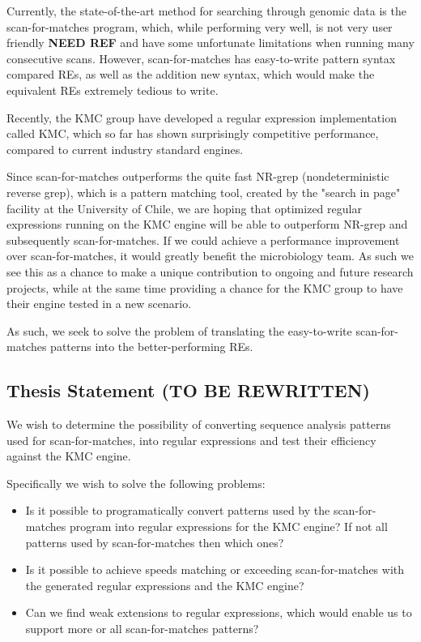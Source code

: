 \documentclass[12pt]{article}
\theoremstyle{definition}
\begin{document}
Currently, the state-of-the-art method for searching through genomic data is the scan-for-matches program, which, while performing very well, is not very user friendly \textbf{NEED REF} and have some unfortunate limitations when running many consecutive scans. However, scan-for-matches has easy-to-write pattern syntax compared REs, as well as the addition new syntax, which would make the equivalent REs extremely tedious to write.

Recently, the KMC group have developed a regular expression implementation called KMC, which so far has shown surprisingly competitive performance, compared to current industry standard engines\cite{two-pass-greedy}.

Since scan-for-matches outperforms the quite fast NR-grep (nondeterministic reverse grep), which is a pattern matching tool, created by the "search in page" facility at the University of Chile\cite{nrgrep}, we are hoping that optimized regular expressions running on the KMC engine will be able to outperform NR-grep and subsequently scan-for-matches.
If we could achieve a performance improvement over scan-for-matches, it would greatly benefit the microbiology team. As such we see this as a chance to make a unique contribution to ongoing and future research projects, while at the same time providing a chance for the KMC group to have their engine tested in a new scenario.

As such, we seek to solve the problem of translating the easy-to-write scan-for-matches patterns into the better-performing REs.


\subsection{Thesis Statement (TO BE REWRITTEN)}

We wish to determine the possibility of converting sequence analysis patterns used for scan-for-matches\cite{scan-for-matches}, into regular expressions\cite{crash-course-regex} and test their efficiency against the KMC\cite{kmc-website} engine.

Specifically we wish to solve the following problems:

\begin{itemize}
	\item Is it possible to programatically convert patterns used by the scan-for-matches program into regular expressions for the KMC engine? If not all patterns used by scan-for-matches then which ones?
	\item Is it possible to achieve speeds matching or exceeding scan-for-matches with the generated regular expressions and the KMC engine?
	\item Can we find weak extensions to regular expressions, which would enable us to support more or all scan-for-matches patterns?
\end{itemize}
\end{document}
